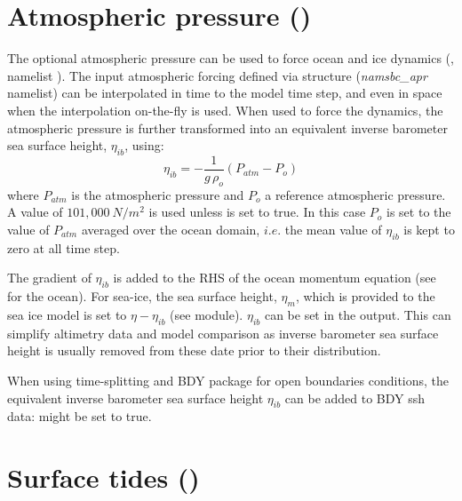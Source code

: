 \documentclass[../tex_main/NEMO_manual]{subfiles}
\begin{document}
\section{Atmospheric pressure (\protect{})}
\label{sec:SBC_apr}


The optional atmospheric pressure can be used to force ocean and ice dynamics 
(, \textit{} namelist ).
The input atmospheric forcing defined via  structure (\textit{namsbc\_apr} namelist) 
can be interpolated in time to the model time step, and even in space when the 
interpolation on-the-fly is used. When used to force the dynamics, the atmospheric 
pressure is further transformed into an equivalent inverse barometer sea surface height, 
$\eta_{ib}$, using:
\begin{equation} \label{eq:SBC_ssh_ib}
	\eta_{ib} = -  \frac{1}{g\,\rho_o}  \left( P_{atm} - P_o \right) 
\end{equation}
where $P_{atm}$ is the atmospheric pressure and $P_o$ a reference atmospheric pressure.
A value of $101,000~N/m^2$ is used unless  is set to true. In this case $P_o$ 
is set to the value of $P_{atm}$ averaged over the ocean domain, $i.e.$ the mean value of 
$\eta_{ib}$ is kept to zero at all time step.

The gradient of $\eta_{ib}$ is added to the RHS of the ocean momentum equation 
(see  for the ocean). For sea-ice, the sea surface height, $\eta_m$, 
which is provided to the sea ice model is set to $\eta - \eta_{ib}$ (see  module).
$\eta_{ib}$ can be set in the output. This can simplify altimetry data and model comparison 
as inverse barometer sea surface height is usually removed from these date prior to their distribution.

When using time-splitting and BDY package for open boundaries conditions, the equivalent 
inverse barometer sea surface height $\eta_{ib}$ can be added to BDY ssh data: 
  might be set to true.

\section{Surface tides (\protect{})}
\label{sec:SBC_tide}
\end{document}
